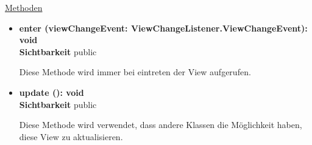 \underline{Methoden}
\begin{itemize}
\itemsep0pt
\item \textbf{enter (viewChangeEvent: ViewChangeListener.ViewChangeEvent): void}\hfill\\
\textbf{Sichtbarkeit} public

Diese Methode wird immer bei eintreten der View aufgerufen.

\item \textbf{update (): void}\hfill\\
\textbf{Sichtbarkeit} public

Diese Methode wird verwendet, dass andere Klassen die Möglichkeit haben, diese View zu aktualisieren.

\end{itemize}